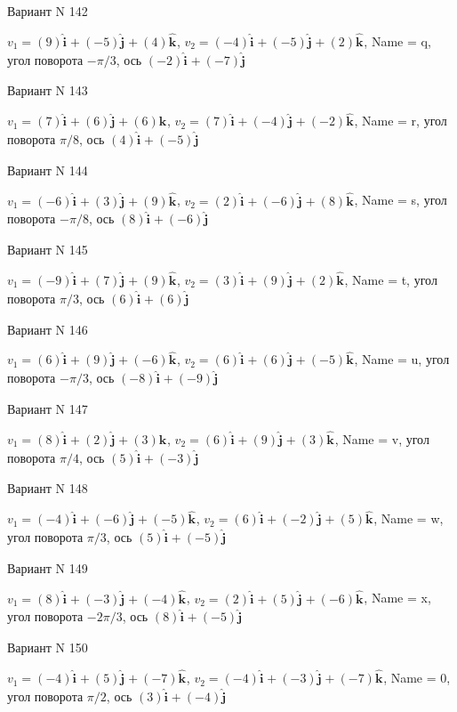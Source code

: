 \documentclass[11pt]{report}
\begin{document}
Вариант N 142

$v_1 = (9)\mathbf{\hat{i}_{}} + (-5)\mathbf{\hat{j}_{}} + (4)\mathbf{\hat{k}_{}}$, $v_2 = (-4)\mathbf{\hat{i}_{}} + (-5)\mathbf{\hat{j}_{}} + (2)\mathbf{\hat{k}_{}}$, Name = q, угол поворота $- \pi / 3$, ось $(-2)\mathbf{\hat{i}_{}} + (-7)\mathbf{\hat{j}_{}}$

Вариант N 143

$v_1 = (7)\mathbf{\hat{i}_{}} + (6)\mathbf{\hat{j}_{}} + (6)\mathbf{\hat{k}_{}}$, $v_2 = (7)\mathbf{\hat{i}_{}} + (-4)\mathbf{\hat{j}_{}} + (-2)\mathbf{\hat{k}_{}}$, Name = r, угол поворота $\pi / 8$, ось $(4)\mathbf{\hat{i}_{}} + (-5)\mathbf{\hat{j}_{}}$

Вариант N 144

$v_1 = (-6)\mathbf{\hat{i}_{}} + (3)\mathbf{\hat{j}_{}} + (9)\mathbf{\hat{k}_{}}$, $v_2 = (2)\mathbf{\hat{i}_{}} + (-6)\mathbf{\hat{j}_{}} + (8)\mathbf{\hat{k}_{}}$, Name = s, угол поворота $- \pi / 8$, ось $(8)\mathbf{\hat{i}_{}} + (-6)\mathbf{\hat{j}_{}}$

Вариант N 145

$v_1 = (-9)\mathbf{\hat{i}_{}} + (7)\mathbf{\hat{j}_{}} + (9)\mathbf{\hat{k}_{}}$, $v_2 = (3)\mathbf{\hat{i}_{}} + (9)\mathbf{\hat{j}_{}} + (2)\mathbf{\hat{k}_{}}$, Name = t, угол поворота $\pi / 3$, ось $(6)\mathbf{\hat{i}_{}} + (6)\mathbf{\hat{j}_{}}$

Вариант N 146

$v_1 = (6)\mathbf{\hat{i}_{}} + (9)\mathbf{\hat{j}_{}} + (-6)\mathbf{\hat{k}_{}}$, $v_2 = (6)\mathbf{\hat{i}_{}} + (6)\mathbf{\hat{j}_{}} + (-5)\mathbf{\hat{k}_{}}$, Name = u, угол поворота $- \pi / 3$, ось $(-8)\mathbf{\hat{i}_{}} + (-9)\mathbf{\hat{j}_{}}$

Вариант N 147

$v_1 = (8)\mathbf{\hat{i}_{}} + (2)\mathbf{\hat{j}_{}} + (3)\mathbf{\hat{k}_{}}$, $v_2 = (6)\mathbf{\hat{i}_{}} + (9)\mathbf{\hat{j}_{}} + (3)\mathbf{\hat{k}_{}}$, Name = v, угол поворота $\pi / 4$, ось $(5)\mathbf{\hat{i}_{}} + (-3)\mathbf{\hat{j}_{}}$

Вариант N 148

$v_1 = (-4)\mathbf{\hat{i}_{}} + (-6)\mathbf{\hat{j}_{}} + (-5)\mathbf{\hat{k}_{}}$, $v_2 = (6)\mathbf{\hat{i}_{}} + (-2)\mathbf{\hat{j}_{}} + (5)\mathbf{\hat{k}_{}}$, Name = w, угол поворота $\pi / 3$, ось $(5)\mathbf{\hat{i}_{}} + (-5)\mathbf{\hat{j}_{}}$

Вариант N 149

$v_1 = (8)\mathbf{\hat{i}_{}} + (-3)\mathbf{\hat{j}_{}} + (-4)\mathbf{\hat{k}_{}}$, $v_2 = (2)\mathbf{\hat{i}_{}} + (5)\mathbf{\hat{j}_{}} + (-6)\mathbf{\hat{k}_{}}$, Name = x, угол поворота $- 2 \pi / 3$, ось $(8)\mathbf{\hat{i}_{}} + (-5)\mathbf{\hat{j}_{}}$

Вариант N 150

$v_1 = (-4)\mathbf{\hat{i}_{}} + (5)\mathbf{\hat{j}_{}} + (-7)\mathbf{\hat{k}_{}}$, $v_2 = (-4)\mathbf{\hat{i}_{}} + (-3)\mathbf{\hat{j}_{}} + (-7)\mathbf{\hat{k}_{}}$, Name = 0, угол поворота $\pi / 2$, ось $(3)\mathbf{\hat{i}_{}} + (-4)\mathbf{\hat{j}_{}}$
\end{document}
